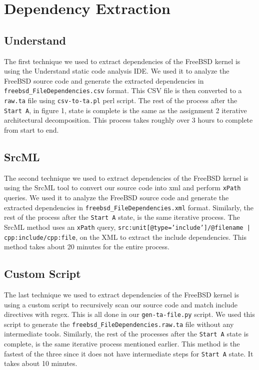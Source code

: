 \documentclass[12pt, dvipsnames, a4paper]{article}
\newcommand{\code}[1]{\texttt{#1}}
\begin{document}
\section{Dependency Extraction}
\subsection{Understand}
The first technique we used to extract dependencies of the FreeBSD kernel is using the Understand static code analysis IDE. We used it to analyze the FreeBSD source code and generate the extracted dependencies in \code{freebsd\_FileDependencies.csv} format. This CSV file is then converted to a \code{raw.ta} file using \code{csv-to-ta.pl} perl script. The rest of the process after the \code{Start A}, in figure 1, state is complete is the same as the assignment 2 iterative architectural decomposition. This process takes roughly over 3 hours to complete from start to end.

\subsection{SrcML}
The second technique we used to extract dependencies of the FreeBSD kernel is using the SrcML tool to convert our source code into xml and perform \code{xPath} queries. We used it to analyze the FreeBSD source code and generate the extracted dependencies in \code{freebsd\_FileDependencies.xml} format. Similarly, the rest of the process after the \code{Start A} state, is the same iterative process. The SrcML method uses an \code{xPath} query, \code{src:unit[@type='include']/@filename | cpp:include/cpp:file}, on the XML to extract the include dependencies. This method takes about 20 minutes for the entire process.

\subsection{Custom Script}
The last technique we used to extract dependencies of the FreeBSD kernel is using a custom script to recursively scan our source code and match include directives with regex. This is all done in our \code{gen-ta-file.py} script. We used this script to generate the \code{freebsd\_FileDependencies.raw.ta} file without any intermediate tools. Similarly, the rest of the processes after the \code{Start A} state is complete, is the same iterative process mentioned earlier. This method is the fastest of the three since it does not have intermediate steps for \code{Start A} state. It takes about 10 minutes.
\end{document}
